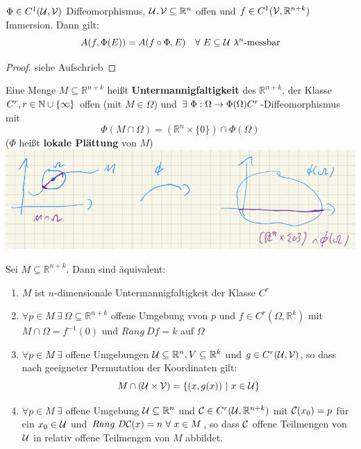   \begin{theorem}
    $\Phi \in C^1(\mathcal{U}, \mathcal{V})$ Diffeomorphismus, $\mathcal{U}, \mathcal{V} \subseteq \mathbb{R}^n$ offen und $f \in C^1(\mathcal{V}, \mathbb{R}^{n+k})$ Immersion. Dann gilt:
    $$A(f, \Phi(E)) = A(f\circ\Phi, E) \ \ \ \forall \ E \subseteq \script{U} \ \lambda^n\text{-messbar}$$
  \end{theorem}
  \begin{proof}
    siehe Aufschrieb
  \end{proof}

  \begin{definition}[Untermannigfaltigkeiten]
    Eine Menge $M \subseteq \mathbb{R}^{n+k}$ heißt \textbf{Untermannigfaltigkeit} des $\mathbb{R}^{n+k}$, der Klasse $C^r,\\ r\in \mathbb{N}\cup\{\infty\}$ offen (mit $M \in \Omega$) und $\exists \ \Phi: \Omega \to \Phi(\Omega) \\
    C^r$-Diffeomorphismus mit
    $$\Phi(M \cap \Omega) = (\mathbb{R}^n \times \{0\}) \cap \Phi(\Omega)$$
    ($\Phi$ heißt \textbf{lokale Plättung} von $M$)\\
    \includegraphics[width=\textwidth]{img/VIII_4_UnterMGF.png}
  \end{definition}

  \begin{theorem}
    Sei $M \subseteq \mathbb{R}^{n+k}$. Dann sind äquivalent:
    \begin{enumerate}
      \item $M$ ist $n$-dimensionale Untermannigfaltigkeit der Klasse $C^r$
      \item $\forall p \in M \ \exists \ \Omega\subseteq\mathbb{R}^{n+k}$ offene Umgebung vvon $p$ und $f \in C^r(\Omega, \mathbb{R}^k)$ mit $M \cap \Omega = f^{-1}(0)$ und $Rang \ Df = k$ auf $\Omega$
      \item $\forall p \in M \ \exists$ offene Umgebungen $\mathcal{U}\subseteq \mathbb{R}^n, V\subseteq \mathbb{R}^k$ und $g \in C^r(\mathcal{U}, \mathcal{V})$, so dass nach geeigneter Permutation der Koordinaten gilt:\\
      $$M \cap (\mathcal{U} \times \mathcal{V}) = \{(x, g(x)) \ | \ x \in \mathcal{U}\}$$
      \item $\forall p \in M \ \exists$ offene Umgebung $\mathcal{U}\subseteq \mathbb{R}^n$ und $\mathcal{C} \in C^r(\mathcal{U}, \mathbb{R}^{n+k})$ mit $\mathcal{C}(x_0) = p$ für ein $x_0 \in \mathcal{U}$ und $Rang \ D\mathcal{C}(x) = n \ \forall \ x\in M$, so dass $\mathcal{C}$ offene Teilmengen von $\mathcal{U}$ in relativ offene Teilmengen von $M$ abbildet. 
    \end{enumerate}
  \end{theorem}

